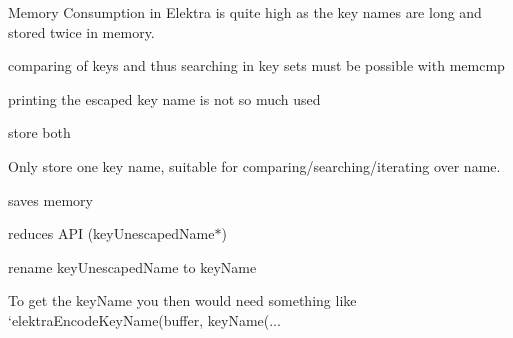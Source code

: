 Memory Consumption in Elektra is quite high as the key names are long and stored twice in memory.


\begin{DoxyItemize}
\item comparing of keys and thus searching in key sets must be possible with memcmp
\end{DoxyItemize}


\begin{DoxyItemize}
\item printing the escaped key name is not so much used
\end{DoxyItemize}


\begin{DoxyItemize}
\item store both
\end{DoxyItemize}

Only store one key name, suitable for comparing/searching/iterating over name.


\begin{DoxyItemize}
\item saves memory
\item reduces A\+PI ({\ttfamily key\+Unescaped\+Name$\ast$})
\end{DoxyItemize}


\begin{DoxyItemize}
\item rename {\ttfamily key\+Unescaped\+Name} to {\ttfamily key\+Name}
\item To get the key\+Name you then would need something like `elektra\+Encode\+Key\+Name(buffer, key\+Name(...
\end{DoxyItemize}